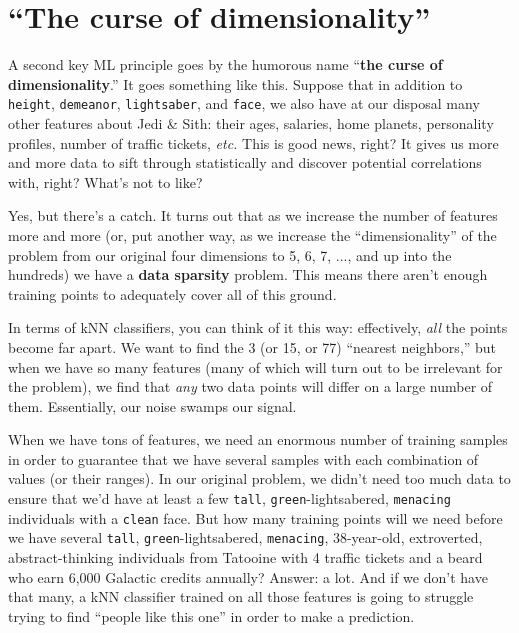 \vspace{1in}
\pagebreak
\vspace{1in}
\section{``The curse of dimensionality''}
\label{sec:curse}


A second key ML principle goes by the humorous name ``\textbf{the curse of
dimensionality}.'' It goes something like this. Suppose that in addition to
\texttt{height}, \texttt{demeanor}, \texttt{lightsaber}, and \texttt{face}, we
also have at our disposal many other features about Jedi \& Sith: their ages,
salaries, home planets, personality profiles, number of traffic tickets,
\textit{etc.} This is good news, right? It gives us more and more data to sift
through statistically and discover potential correlations with, right? What's
not to like?


Yes, but there's a catch. It turns out that as we increase the number of
features more and more (or, put another way, as we increase the
``dimensionality'' of the problem from our original four dimensions to 5, 6, 7,
..., and up into the hundreds) we have a \textbf{data sparsity} problem. This
means there aren't enough training points to adequately cover all of this
ground.

In terms of kNN classifiers, you can think of it this way: effectively,
\textit{all} the points become far apart. We want to find the 3 (or 15, or 77)
``nearest neighbors,'' but when we have so many features (many of which will
turn out to be irrelevant for the problem), we find that \textit{any} two data
points will differ on a large number of them. Essentially, our noise swamps our
signal.

When we have tons of features, we need an enormous number of training samples
in order to guarantee that we have several samples with each combination of
values (or their ranges). In our original problem, we didn't need too much data
to ensure that we'd have at least a few \texttt{tall},
\texttt{green}-lightsabered, \texttt{menacing} individuals with a
\texttt{clean} face. But how many training points will we need before we have
several \texttt{tall}, \texttt{green}-lightsabered, \texttt{menacing},
38-year-old, extroverted, abstract-thinking individuals from Tatooine with 4
traffic tickets and a beard who earn 6,000 Galactic credits annually? Answer: a
lot. And if we don't have that many, a kNN classifier trained on all those
features is going to struggle trying to find ``people like this one'' in order
to make a prediction.

